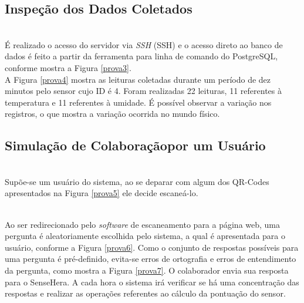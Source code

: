 \subsection{Inspeção dos Dados Coletados}
\label{subsec:dados}
\\\null \quad É realizado o acesso do servidor via \textit{\acrlong{SSH}} (\acrshort{SSH}) e o acesso direto ao banco de dados é feito a partir da ferramenta para linha de comando do PostgreSQL, conforme mostra a Figura \ref{prova3}.
\\\null \quad A Figura \ref{prova4} mostra as leituras coletadas durante um período de dez minutos pelo sensor cujo ID é 4. Foram realizadas 22 leituras, 11 referentes à temperatura e 11 referentes à umidade. É possível observar a variação nos registros, o que mostra a variação ocorrida no mundo físico.

\subsection{Simulação de Colaboraçãopor um Usuário}
\label{subsec:colaboracao}
\\\null \quad Supõe-se um usuário do sistema, ao se deparar com algum dos QR-Codes apresentados na Figura \ref{prova5} ele decide escaneá-lo.

\\\null \quad Ao ser redirecionado pelo \textit{software} de escaneamento para a página web, uma pergunta é aleatoriamente escolhida pelo sistema, a qual é apresentada para o usuário, conforme a Figura \ref{prova6}. Como o conjunto de respostas possíveis para uma pergunta é pré-definido, evita-se erros de ortografia e erros de entendimento da pergunta, como mostra a Figura \ref{prova7}. O colaborador envia sua resposta para o SenseHera. A cada hora o sistema irá verificar se há uma concentração das respostas e realizar as operações referentes ao cálculo da pontuação do sensor.

